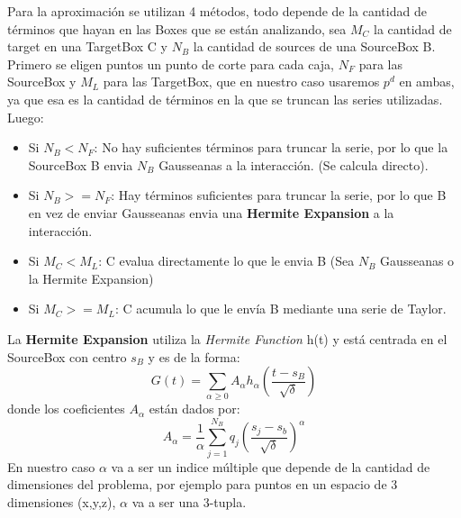 \documentclass[letter, 10pt]{article}
\begin{document}
Para la aproximación se utilizan 4 métodos, todo depende de la cantidad de términos que hayan en las Boxes que se están analizando, sea $M_C$ la cantidad de target en una TargetBox C y $N_B$ la cantidad de sources de una SourceBox B. Primero se eligen puntos un punto de corte para cada caja, $N_F$ para las SourceBox y $M_L$ para las TargetBox, que en nuestro caso usaremos $p^d$ en ambas, ya que esa es la cantidad de términos en la que se truncan las series utilizadas. Luego:
\begin{itemize}
\item Si $N_B < N_F$: No hay suficientes términos para truncar la serie, por lo que la SourceBox B envia $N_B$ Gausseanas a la interacción. (Se calcula directo).
\item Si $N_B >= N_F$: Hay términos suficientes para truncar la serie, por lo que B en vez de enviar Gausseanas envia una \textbf{Hermite Expansion} a la interacción.

\item Si $M_C < M_L$: C evalua directamente lo que le envia B (Sea $N_B$ Gausseanas o la Hermite Expansion)

\item Si $M_C >= M_L$: C acumula lo que le envía B mediante una serie de Taylor.
\end{itemize}


La \textbf{Hermite Expansion} utiliza la \textit{Hermite Function} h(t) y está centrada en el SourceBox con centro $s_B$ y es de la forma:
\begin{equation}
    G(t) = \sum_{\alpha \geq 0} A_\alpha h_\alpha\left( \frac{t- s_B}{\sqrt{\delta}}\right)
\end{equation}
donde los coeficientes $A_\alpha$ están dados por:
\begin{equation}
 A_\alpha = \frac{1}{\alpha} \sum_{j=1}^{N_B} q_j \left(\frac{s_j - s_b}{\sqrt{\delta}}\right)^\alpha
\end{equation}
En nuestro caso $\alpha$ va a ser un indice múltiple que depende de la cantidad de dimensiones del problema, por ejemplo para puntos en un espacio de 3 dimensiones (x,y,z), $\alpha$ va a ser una 3-tupla.
\end{document}
